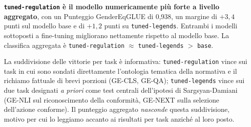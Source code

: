 \documentclass[pdflatex, sn-apa]{sn-jnl}%
\theoremstyle{thmstyleone}%
\theoremstyle{thmstyletwo}%
\theoremstyle{thmstylethree}%
\newcommand{\modelbase}{\texttt{base}}
\newcommand{\modellegends}{\texttt{tuned-legends}}
\newcommand{\modelreg}{\texttt{tuned-regulation}}
\begin{document}
\textbf{\modelreg{} è il modello numericamente più forte a livello aggregato},
con un Punteggio GenderEqGLUE di 0,938, un margine di $+3,4$ punti sul modello
base e di $+1,2$ punti su \modellegends. Entrambi i modelli sottoposti a
fine-tuning migliorano nettamente rispetto al modello base. La classifica
aggregata è \modelreg{} $\approx$ \modellegends{} $>$ \modelbase.


La suddivisione delle vittorie per task è informativa: \modelreg{} vince sui task
in cui sono sondati direttamente l'ontologia tematica della normativa e il
richiamo fattuale di brevi porzioni (GE-CLS, GE-QA); \modellegends{} vince sui due
task designati \emph{a priori} come test centrali dell'ipotesi di Sargsyan-Damiani
(GE-NLI sul riconoscimento della conformità, GE-NEXT sulla selezione dell'azione
conforme). Il punteggio aggregato \emph{nasconde} questa suddivisione, motivo per
cui lo leggiamo accanto ai risultati per task anziché al loro posto.



\end{document}
